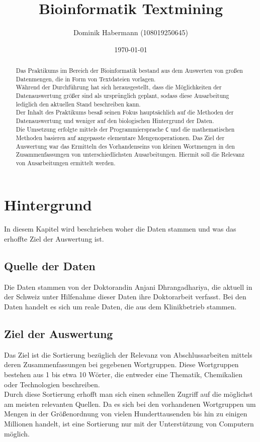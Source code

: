 \documentclass[a4paper,10pt]{article}
\title{Bioinformatik Textmining}
\author{Dominik Habermann (108019250645)}
\date{\today}
\newcommand{\dataSource}[0]{Anjani Dhrangadhariya}
\begin{document}
\maketitle

\begin{abstract}
    Das Praktikums im Bereich der Bioinformatik bestand aus dem Auswerten von großen Datenmengen, die in Form von Textdateien vorlagen.\\
    Während der Durchführung hat sich herausgestellt, dass die Möglichkeiten der Datenauswertung größer sind als ursprünglich geplant, sodass diese Ausarbeitung lediglich den aktuellen Stand beschreiben kann.\\
    Der Inhalt des Praktikums besaß seinen Fokus hauptsächlich auf die Methoden der Datenauswertung und weniger auf den biologischen Hintergrund der Daten.\\

    Die Umsetzung erfolgte mittels der Programmiersprache \texttt{C} und die mathematischen Methoden basieren auf angepasste elementare Mengenoperationen. Das Ziel der Auswertung war das Ermitteln des Vorhandenseins von kleinen Wortmengen in den Zusammenfassungen von unterschiedlichsten Ausarbeitungen. Hiermit soll die Relevanz von Ausarbeitungen ermittelt werden.
\end{abstract}

\section{Hintergrund}
    In diesem Kapitel wird beschrieben woher die Daten stammen und was das erhoffte Ziel der Auswertung ist.

    \subsection{Quelle der Daten}
        Die Daten stammen von der Doktorandin \dataSource, die aktuell in der Schweiz unter Hilfenahme dieser Daten ihre Doktorarbeit verfasst. Bei den Daten handelt es sich um reale Daten, die aus dem Klinikbetrieb stammen.

    \subsection{Ziel der Auswertung}
        Das Ziel ist die Sortierung bezüglich der Relevanz von Abschlussarbeiten mittels deren Zusammenfassungen bei gegebenen Wortgruppen. Diese Wortgruppen bestehen aus 1 bis etwa 10 Wörter, die entweder eine Thematik, Chemikalien oder Technologien beschreiben.\\
        Durch diese Sortierung erhofft man sich einen schnellen Zugriff auf die möglichst am meisten relevanten Quellen. Da es sich bei den vorhandenen Wortgruppen um Mengen in der Größenordnung von vielen Hunderttausenden bis hin zu einigen Millionen handelt, ist eine Sortierung nur mit der Unterstützung von Computern möglich.
\end{document}
